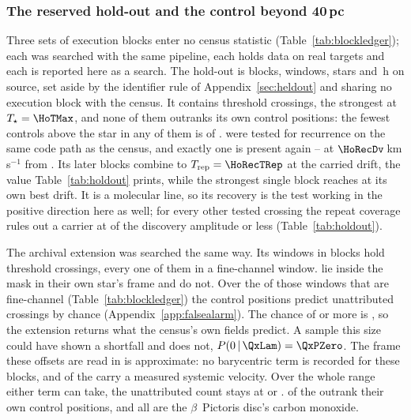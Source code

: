 \subsubsection{The reserved hold-out and the control beyond 40\,pc}
\label{sec:holdoutsearch}

Three sets of execution blocks enter no census statistic
(Table~\ref{tab:blockledger}); each was searched with the same pipeline, each
holds data on real targets and each is reported here as a search. The hold-out is \HoNBlock{} blocks, \HoNWin{} windows, \HoNStar{} stars
and \HoHours\,h on source, set aside by the identifier rule of
Appendix~\ref{sec:heldout} and sharing no execution block
with the census. It contains \HoNCross{} threshold crossings,
the strongest at $T_\star=\HoTMax$, and none of them outranks its own
control positions: the fewest controls above the star in any of them is
\HoNCtrlMin{} of \NCtrl. \HoNTested{} were tested for recurrence on the same
code path as the census, and exactly one is present again -- \HoRecStar{} at
$\HoRecDv$\,km\,s$^{-1}$ from \HoRecLine. Its \HoRecNRep{} later blocks
combine to $T_{\rm rep}=\HoRecTRep$ at the carried drift, the value
Table~\ref{tab:holdout} prints, while the strongest single block reaches
\HoRecTAnyDrift{} at its own best drift. It is a molecular line, so its
recovery is the test working in the positive direction here as well; for
every other tested crossing the repeat coverage rules out a carrier at
\HoFracMax{} of the discovery amplitude or less (Table~\ref{tab:holdout}).

The archival extension was searched the same way. Its \LdgExtWin{} windows in
\LdgExtEB{} blocks hold \QxObsCross{} threshold crossings, every one of them
in a fine-channel window. \QxObsAttr{} lie inside the mask in their own
star's frame and \QxObsUnattr{} do not. Over the \QxNWinA{} of those windows that are
fine-channel (Table~\ref{tab:blockledger}) the
control positions predict \QxLam{} unattributed crossings by chance
(Appendix~\ref{app:falsealarm}). The chance of \QxObsUnattr{} or more is
\QxPGe, so the extension returns what the census's own fields predict.
A sample this size could have shown a
shortfall and does not, $P(0\,|\,\QxLam)=\QxPZero$. The frame these
offsets are read in is approximate: no barycentric term is recorded for
these blocks, and \QxNVsysCross{} of the \QxObsCross{} carry a measured
systemic velocity. Over the whole range either term can take, the
unattributed count stays at \QxObsUnattrLo{} or \QxObsUnattrHi.
\ExtNStageOne{} of the \QxObsCross{} outrank their own control positions,
and all \ExtNStageOne{} are the $\beta$~Pictoris disc's carbon monoxide.

